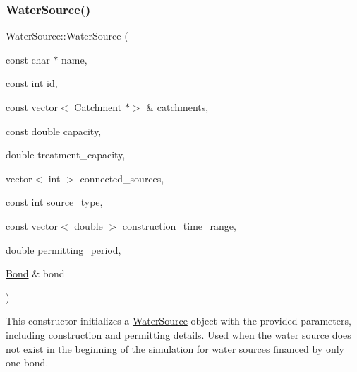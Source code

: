 \subsubsection{\texorpdfstring{Water\+Source()}{WaterSource()}\hspace{0.1cm}{\footnotesize\ttfamily [3/8]}}
{\footnotesize\ttfamily Water\+Source\+::\+Water\+Source (\begin{DoxyParamCaption}\item[{const char $\ast$}]{name,  }\item[{const int}]{id,  }\item[{const vector$<$ \mbox{\hyperlink{classCatchment}{Catchment}} $\ast$$>$ \&}]{catchments,  }\item[{const double}]{capacity,  }\item[{double}]{treatment\+\_\+capacity,  }\item[{vector$<$ int $>$}]{connected\+\_\+sources,  }\item[{const int}]{source\+\_\+type,  }\item[{const vector$<$ double $>$}]{construction\+\_\+time\+\_\+range,  }\item[{double}]{permitting\+\_\+period,  }\item[{\mbox{\hyperlink{classBond}{Bond}} \&}]{bond }\end{DoxyParamCaption})}



This constructor initializes a {\ttfamily \mbox{\hyperlink{classWaterSource}{Water\+Source}}} object with the provided parameters, including construction and permitting details. Used when the water source does not exist in the beginning of the simulation for water sources financed by only one bond. 


